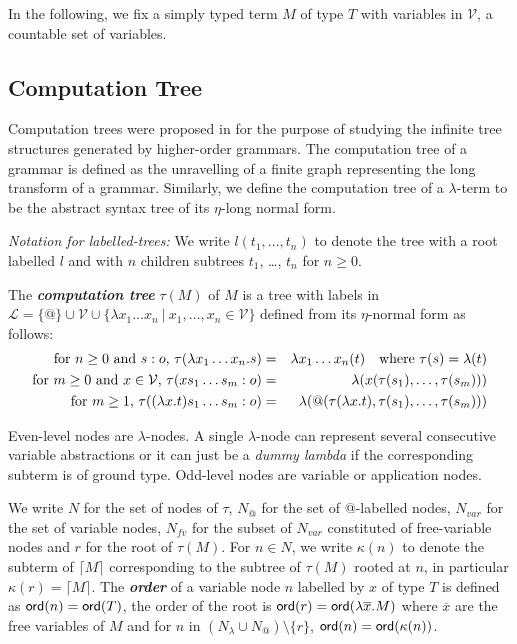 \documentclass{llncs}
\newcommand\defname[1]{{\bf\em #1}\index{#1}}
\newcommand{\elnf}[1]{\lceil #1\rceil} %
\newcommand\ord[1]{{\sf ord}(#1)}
\newcommand\union{\cup}
\begin{document}
In the following, we fix a simply typed term $M$ of type $T$ with variables in $\mathcal{V}$, a countable set of variables.
\subsection{Computation Tree}

Computation trees were proposed in \cite{OngLics2006} for the purpose of studying the infinite tree structures generated by higher-order grammars. The computation tree of a grammar is defined as the unravelling of a finite graph representing the long transform of a grammar. Similarly, we define the computation tree of a $\lambda$-term to be the abstract syntax tree of its $\eta$-long normal form.

\emph{Notation for labelled-trees:} We write $l(t_1, \ldots, t_n)$ to denote the tree with a root labelled $l$ and with $n$ children subtrees $t_1$, \ldots, $t_n$ for $
n \geq 0$.

\begin{definition}
The \defname{computation tree} $\tau(M)$ of $M$ is
a tree with labels in $ \mathcal{L} = \{ @ \} \union \mathcal{V} \union \{ \lambda x_1 \ldots x_n \ | \ x_1 ,\ldots, x_n \in \mathcal{V} \}$ defined from its $\eta$-normal form as follows:
\begin{eqnarray*}
  \mbox{for $n\geq 0$ and $s:o$, } \tau(\lambda x_1 \ldots x_n . s) &=& \lambda x_1 \ldots x_n(t) \mbox{\quad where $\tau(s) = \lambda(t)$}\\
  \mbox{for $m\geq 0$ and $x \in  \mathcal{V}$, } \tau( x s_1 \ldots s_m : o) &=&  \lambda (x(\tau(s_1),\ldots,\tau(s_m)))\\
  \mbox{for $m \geq 1$, } \tau((\lambda x.t) s_1 \ldots s_m :o) &=& \lambda (@(\tau(\lambda x.t),\tau(s_1),\ldots,\tau(s_m)))
\end{eqnarray*}
\end{definition}

Even-level nodes are $\lambda$-nodes. A single $\lambda$-node can represent several consecutive variable abstractions or it can just be
a \textsl{dummy lambda} if the corresponding subterm is of ground type.
Odd-level nodes are variable or application nodes.

We write $N$ for the set of nodes of $\tau$, $N_@$ for the set of @-labelled nodes,
$N_{var}$ for the set of variable nodes,
$N_{fv}$ for the subset of $N_{var}$ constituted of free-variable nodes and $r$ for the root of $\tau(M)$.
For $n \in N$, we write $\kappa(n)$ to denote the subterm of $\elnf{M}$
corresponding to the subtree of $\tau(M)$ rooted at $n$, in particular $\kappa(r) = \elnf{M}$.
The \defname{order} of a variable node $n$ labelled by $x$ of type $T$ 
is defined as $\ord{n} = \ord{T}$, the order of the root is $\ord{r} = \ord{\lambda \overline{x} . M}$ where $\overline{x}$ are the free variables of $M$ and for $n$ in $(N_\lambda \union N_@) \setminus \{ r \}$, $\ord{n} = \ord{\kappa(n)}$.
\end{document}
